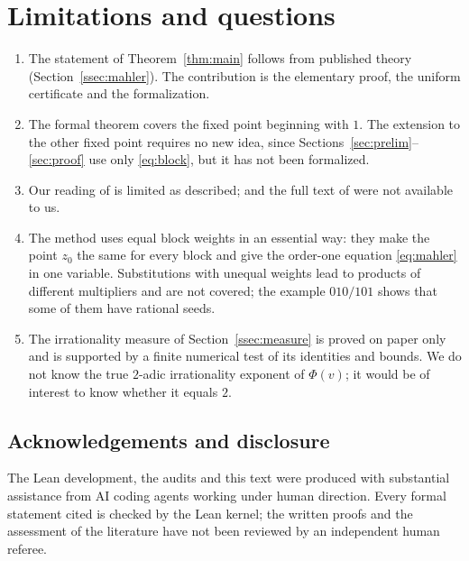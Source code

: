 \documentclass[11pt,reqno]{amsart}
\theoremstyle{definition}
\theoremstyle{remark}
\begin{document}
\section{Limitations and questions}\label{sec:limits}

\begin{enumerate}
\item The statement of Theorem~\ref{thm:main} follows from published theory
(Section~\ref{ssec:mahler}).  The contribution is the elementary proof, the
uniform certificate and the formalization.
\item The formal theorem covers the fixed point beginning with $1$.  The
extension to the other fixed point requires no new idea, since
Sections~\ref{sec:prelim}--\ref{sec:proof} use only \eqref{eq:block}, but it
has not been formalized.
\item Our reading of \cite{Molchanov1983} is limited as described;
\cite{WangXu2006,Wang2006} and the full text of \cite{Dejesus2026} were not
available to us.
\item The method uses equal block weights in an essential way: they make
the point $z_0$ the same for every block and give the order-one equation
\eqref{eq:mahler} in one variable.  Substitutions with unequal weights lead
to products of different multipliers and are not covered; the example
$010/101$ shows that some of them have rational seeds.
\item The irrationality measure of Section~\ref{ssec:measure} is proved on
paper only and is supported by a finite numerical test of its identities
and bounds.  We do not know the true $2$-adic irrationality exponent of
$\Phi(v)$; it would be of interest to know whether it equals $2$.
\end{enumerate}

\subsection*{Acknowledgements and disclosure}
The Lean development, the audits and this text were produced with
substantial assistance from AI coding agents working under human direction.
Every formal statement cited is checked by the Lean kernel; the written
proofs and the assessment of the literature have not been reviewed by an
independent human referee.



\end{document}
